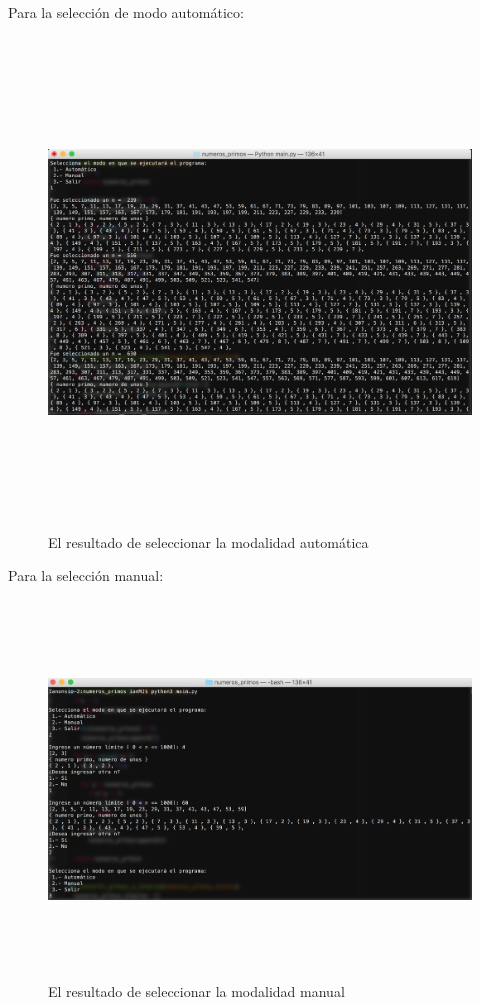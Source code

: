 \documentclass[12pt]{article}
\begin{document}
Para la selección de modo automático:
\begin{figure}[H]
\includegraphics[width=\textwidth, height=13cm]{primos_automatico}
\caption{El resultado de seleccionar la modalidad automática}
\label{fig:primos_automatico}
\end{figure}

\vspace{1em}

Para la selección manual:
\begin{figure}[H]
\includegraphics[width=\textwidth, height=10cm]{primos_manual}
\caption{El resultado de seleccionar la modalidad manual}
\label{fig:primos_manual}
\end{figure}
\end{document}
